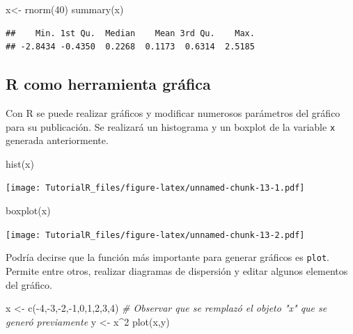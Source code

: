 \documentclass[
]{book}
\newenvironment{Shaded}{\begin{snugshade}}{\end{snugshade}}
\newcommand{\CommentTok}[1]{\textcolor[rgb]{0.56,0.35,0.01}{\textit{#1}}}
\newcommand{\DecValTok}[1]{\textcolor[rgb]{0.00,0.00,0.81}{#1}}
\newcommand{\FunctionTok}[1]{\textcolor[rgb]{0.00,0.00,0.00}{#1}}
\newcommand{\NormalTok}[1]{#1}
\newcommand{\OtherTok}[1]{\textcolor[rgb]{0.56,0.35,0.01}{#1}}
\newcommand{\SpecialCharTok}[1]{\textcolor[rgb]{0.00,0.00,0.00}{#1}}
\begin{document}
\begin{Shaded}
\begin{Highlighting}[]
\NormalTok{x}\OtherTok{\textless{}{-}} \FunctionTok{rnorm}\NormalTok{(}\DecValTok{40}\NormalTok{)}
\FunctionTok{summary}\NormalTok{(x)}
\end{Highlighting}
\end{Shaded}

\begin{verbatim}
##    Min. 1st Qu.  Median    Mean 3rd Qu.    Max. 
## -2.8434 -0.4350  0.2268  0.1173  0.6314  2.5185
\end{verbatim}

\hypertarget{r-como-herramienta-gruxe1fica}{%
\subsection{R como herramienta gráfica}\label{r-como-herramienta-gruxe1fica}}

Con R se puede realizar gráficos y modificar numerosos parámetros del gráfico para su publicación. Se realizará un histograma y un boxplot de la variable \texttt{x} generada anteriormente.

\begin{Shaded}
\begin{Highlighting}[]
\FunctionTok{hist}\NormalTok{(x)}
\end{Highlighting}
\end{Shaded}

\texttt{[image: TutorialR\_files/figure-latex/unnamed-chunk-13-1.pdf]}

\begin{Shaded}
\begin{Highlighting}[]
\FunctionTok{boxplot}\NormalTok{(x)}
\end{Highlighting}
\end{Shaded}

\texttt{[image: TutorialR\_files/figure-latex/unnamed-chunk-13-2.pdf]}

Podría decirse que la función más importante para generar gráficos es \texttt{plot}. Permite entre otros, realizar diagramas de dispersión y editar algunos elementos del gráfico.

\begin{Shaded}
\begin{Highlighting}[]
\NormalTok{x }\OtherTok{\textless{}{-}} \FunctionTok{c}\NormalTok{(}\SpecialCharTok{{-}}\DecValTok{4}\NormalTok{,}\SpecialCharTok{{-}}\DecValTok{3}\NormalTok{,}\SpecialCharTok{{-}}\DecValTok{2}\NormalTok{,}\SpecialCharTok{{-}}\DecValTok{1}\NormalTok{,}\DecValTok{0}\NormalTok{,}\DecValTok{1}\NormalTok{,}\DecValTok{2}\NormalTok{,}\DecValTok{3}\NormalTok{,}\DecValTok{4}\NormalTok{)  }\CommentTok{\# Observar que se remplazó el objeto "x" que se generó previamente}
\NormalTok{y }\OtherTok{\textless{}{-}}\NormalTok{ x}\SpecialCharTok{\^{}}\DecValTok{2}
\FunctionTok{plot}\NormalTok{(x,y)}
\end{Highlighting}
\end{Shaded}
\end{document}
